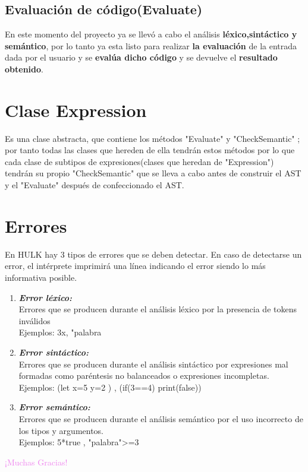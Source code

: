 \documentclass[a4paper,12pt]{article}
\begin{document}
	\subsection{Evaluación de código(Evaluate)}
	
	En este momento del proyecto ya se llevó a cabo el análisis \textbf{léxico,sintáctico y semántico}, por lo tanto ya esta listo para realizar \textbf{la evaluación} de la entrada dada por el usuario y se \textbf{evalúa dicho código} y se devuelve el \textbf{resultado obtenido}.
	
	\section{\color{violet}Clase Expression}
	
	Es una clase abstracta, que contiene los métodos "Evaluate" y "CheckSemantic" ; por tanto todas las clases que hereden de ella tendrán estos métodos por lo que cada clase de subtipos de expresiones(clases que heredan de "Expression") tendrán su propio "CheckSemantic" que se lleva a cabo antes de construir el AST y el "Evaluate" después de confeccionado el AST.
	
	\newpage
	\section{\color{red}Errores}
	
	  \begin{center}
		En HULK hay 3 tipos de errores que se deben detectar. En caso de detectarse un error, el intérprete imprimirá una línea indicando el error siendo lo más informativa posible.
	  \end{center}

    \renewcommand{\labelenumi}{$\bigstar$}
	\begin{enumerate}
		
		\color{red}
		\item \normalcolor \textbf{\textit{Error léxico:}}\\
		Errores que se producen durante el análisis léxico por la presencia de tokens inválidos\\
		Ejemplos: 3x, "palabra
		
		\color{red}
		\item \normalcolor \textbf{\textit{Error sintáctico:}}\\
		Errores que se producen durante el análisis sintáctico por expresiones mal formadas como paréntesis no balanceados o expresiones incompletas.\\
		Ejemplos: (let x=5 y=2 ) , (if(3==4) print(false))
		
		\color{red}
		\item \normalcolor \textbf{\textit{Error semántico:}}\\
		Errores que se producen durante el análisis semántico por el uso incorrecto de los tipos y argumentos.\\
		Ejemplos: 5*true , "palabra">=3
		
	
	\end{enumerate}
	  


	\begin{center}
		\Huge\textcolor{violet}{¡Muchas Gracias!}
	\end{center}
	
\end{document}

